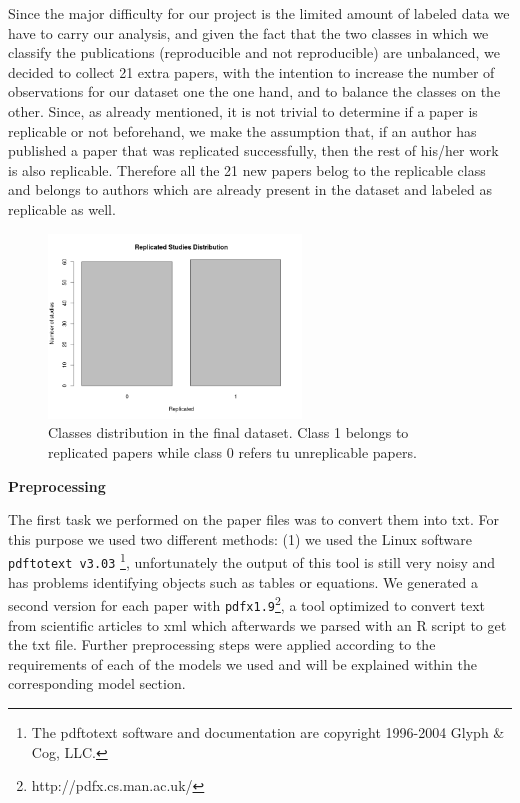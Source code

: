 \documentclass[12pt]{article}
\begin{document}
Since the major difficulty for our project is the limited amount of labeled data we have to carry our analysis, and given the fact that the two classes in which we classify the publications  (reproducible and not reproducible) are unbalanced, we decided to collect 21 extra papers, with the intention to increase the number of observations for our dataset one the one hand, and to balance the classes on the other. Since, as already mentioned, it is not trivial to determine if a paper is replicable or not beforehand, we make the assumption that, if an author has published a paper that was replicated successfully, then the rest of his/her work is also replicable. Therefore all the 21 new papers belog to the replicable class and belongs to authors which are already present in the dataset and labeled as replicable as well. 

\begin{figure}[htbp]
    \centering
    \includegraphics[width=0.6\textwidth]{ds_exploration_01}
    \caption{Classes distribution in the final dataset. Class 1 belongs to replicated papers while class 0 refers tu unreplicable papers.}
    \label{fig:classes}
\end{figure}

\textbf{Preprocessing}

The first task we performed on the paper files was to convert them into txt. For this purpose we used two different methods: (1) we used the Linux software \texttt{pdftotext v3.03}  \footnote{The pdftotext software and documentation are copyright 1996-2004 Glyph \& Cog, LLC.}, unfortunately the output of this tool is still very noisy and has problems identifying objects such as tables or equations. We generated a second version for each paper with \texttt{pdfx1.9}\footnote{http://pdfx.cs.man.ac.uk/}, a tool optimized to convert text from scientific articles to xml \cite{pdfx} which afterwards we parsed with an R script to get the txt file. Further preprocessing steps were applied according to the requirements of each of the models we used and will be explained within the corresponding model section. 
\end{document}
